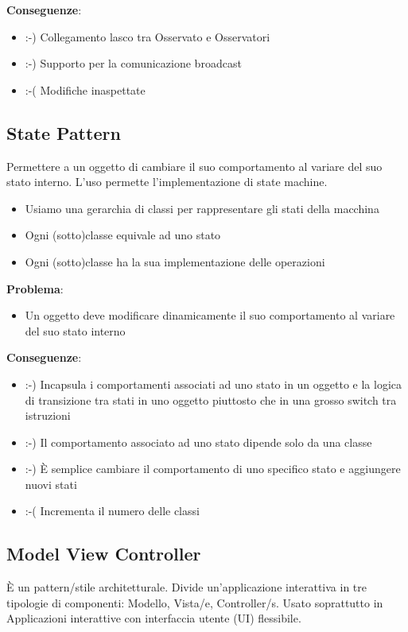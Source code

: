 \vspace{4mm}
\noindent \textbf{Conseguenze}:
\begin{itemize}
    \item :-) Collegamento lasco tra Osservato e Osservatori
    \item :-) Supporto per la comunicazione broadcast
    \item :-( Modifiche inaspettate
\end{itemize}

\break
\subsection{State Pattern}
Permettere a un oggetto di cambiare il suo comportamento al variare del suo stato interno. L'uso permette l'implementazione di state machine.
\begin{itemize}
    \item Usiamo una gerarchia di classi per rappresentare gli stati della macchina
    \item Ogni (sotto)classe equivale ad uno stato
    \item Ogni (sotto)classe ha la sua implementazione delle operazioni
\end{itemize}

\vspace{4mm}
\noindent \textbf{Problema}:
\begin{itemize}
    \item Un oggetto deve modificare dinamicamente il suo comportamento al variare del suo stato interno
\end{itemize}

\vspace{4mm}
\noindent \textbf{Conseguenze}:
\begin{itemize}
    \item :-) Incapsula i comportamenti associati ad uno stato in un oggetto e la logica di transizione tra stati in uno oggetto piuttosto che in una grosso switch tra istruzioni
    \item :-) Il comportamento associato ad uno stato dipende solo da una classe
    \item :-) \`E semplice cambiare il comportamento di uno specifico stato e aggiungere nuovi stati
    \item :-( Incrementa il numero delle classi
\end{itemize}

\subsection{Model View Controller}
\`E un pattern/stile architetturale. Divide un’applicazione interattiva in tre tipologie di componenti: Modello, Vista/e, Controller/s. Usato soprattutto in Applicazioni interattive con interfaccia utente (UI) flessibile.

